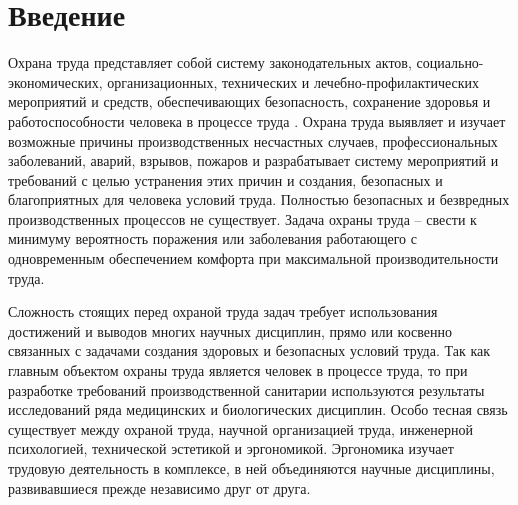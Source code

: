 \documentclass[12pt,a4paper]{report}
\begin{document}
\section{Введение}
Охрана труда представляет собой систему законодательных актов, социально-экономических, организационных, технических и лечебно-профилактических мероприятий и средств, обеспечивающих безопасность, сохранение здоровья и работоспособности человека в процессе труда \cite{Oh}. Охрана труда выявляет и изучает возможные причины производственных несчастных случаев, профессиональных заболеваний, аварий, взрывов, пожаров и разрабатывает систему мероприятий и требований с целью устранения этих причин и создания, безопасных и благоприятных для человека условий труда. Полностью безопасных и безвредных производственных процессов не существует. Задача охраны труда – свести к  минимуму вероятность поражения или заболевания работающего с одновременным обеспечением комфорта при максимальной производительности труда.

Сложность стоящих перед охраной труда задач требует использования достижений и выводов многих научных дисциплин, прямо или косвенно связанных с задачами создания здоровых и безопасных условий труда. Так как главным объектом охраны труда является человек в процессе труда, то при разработке требований производственной санитарии используются результаты исследований ряда медицинских и биологических дисциплин. Особо тесная связь существует между охраной труда, научной организацией труда, инженерной психологией, технической эстетикой и эргономикой. Эргономика изучает трудовую деятельность в комплексе, в ней объединяются научные дисциплины, развивавшиеся прежде независимо друг от друга. 
\end{document}
